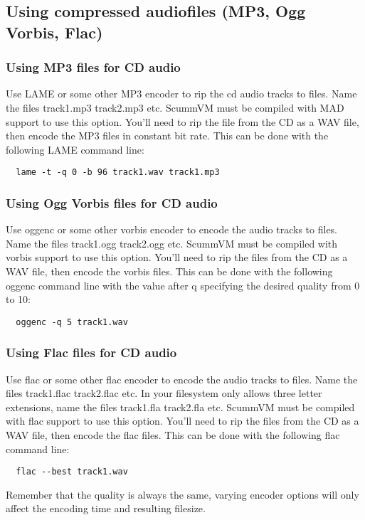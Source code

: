 

\subsection{Using compressed audiofiles (MP3, Ogg Vorbis, Flac)}

\subsubsection{Using MP3 files for CD audio}

Use LAME or some other MP3 encoder to rip the cd audio tracks to files. Name
the files track1.mp3 track2.mp3 etc. ScummVM must be compiled with MAD support
to use this option. You'll need to rip the file from the CD as a WAV file,
then encode the MP3 files in constant bit rate. This can be done with the 
following LAME command line:
\begin{verbatim}
  lame -t -q 0 -b 96 track1.wav track1.mp3
\end{verbatim}


\subsubsection{Using Ogg Vorbis files for CD audio}

Use oggenc or some other vorbis encoder to encode the audio tracks to files.
Name the files track1.ogg track2.ogg etc. ScummVM must be compiled with vorbis
support to use this option. You'll need to rip the files from the CD as a WAV
file, then encode the vorbis files. This can be done with the following oggenc
command line with the value after q specifying the desired quality from 0 to 10:
\begin{verbatim}
  oggenc -q 5 track1.wav
\end{verbatim}


\subsubsection{Using Flac files for CD audio}
Use flac or some other flac encoder to encode the audio tracks to files.
Name the files track1.flac track2.flac etc. In your filesystem only allows 
three letter extensions, name the files track1.fla track2.fla etc. 
ScummVM must be compiled with flac support to use this option. You'll need to 
rip the files from the CD as a WAV file, then encode the flac files. This can 
be done with the following flac command line:
\begin{verbatim}
  flac --best track1.wav
\end{verbatim}
%
Remember that the quality is always the same, varying encoder options will only
affect the encoding time and resulting filesize. 


